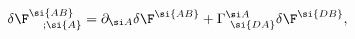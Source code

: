 \begin{equation}
\delta \F^{\si{AB}}_{\ \ \ ;\si{A}} = \partial_{\si A} \delta \F^{\si{AB}} +
\Gamma^{\si A}_{\ \si{DA}} \delta \F^{\si{DB}},
\end{equation}


